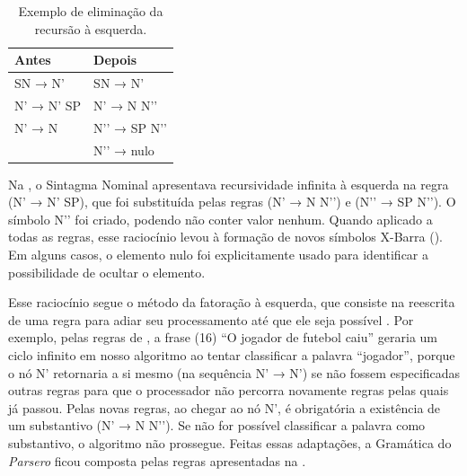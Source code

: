 \documentclass[portuguese]{textolivre}
\begin{document}
\begin{table}[htbp]
\caption{Exemplo de eliminação da recursão à esquerda.}
\label{tbl1}
\centering
\begin{tabular}{ll}
\toprule
\textbf{Antes} & \textbf{Depois} \\ 
\midrule
SN → N’  & SN → N’  \\ 
N’ → N’ SP       & N’ → N N’’   \\ 
N’ → N      & N’’ → SP N’’   \\
& N’’ → nulo   \\
\bottomrule
\end{tabular}
\end{table}

Na , o Sintagma Nominal apresentava recursividade infinita à esquerda na regra (N’ → N’ SP), que foi substituída pelas regras (N’ → N N’’) e (N’’ → SP N’’). O símbolo N’’ foi criado, podendo não conter valor nenhum. Quando aplicado a todas as regras, esse raciocínio levou à formação de novos símbolos X-Barra (). Em alguns casos, o elemento nulo foi explicitamente usado para identificar a possibilidade de ocultar o elemento. 

Esse raciocínio segue o método da fatoração à esquerda, que consiste na reescrita de uma regra para adiar seu processamento até que ele seja possível \cite[p. 41]{thain_introduction_2020}. Por exemplo, pelas regras de \textcite{othero_gramatica_2009}, a frase (16) “O jogador de futebol caiu” geraria um ciclo infinito em nosso algoritmo ao tentar classificar a palavra “jogador”, porque o nó N’ retornaria a si mesmo (na sequência N’ → N’) se não fossem especificadas outras regras para que o processador não percorra novamente regras pelas quais já passou. Pelas novas regras, ao chegar ao nó N’, é obrigatória a existência de um substantivo (N’ → N N’’). Se não for possível classificar a palavra como substantivo, o algoritmo não prossegue. Feitas essas adaptações, a Gramática do \textit{Parsero} ficou composta pelas regras apresentadas na .
\end{document}
